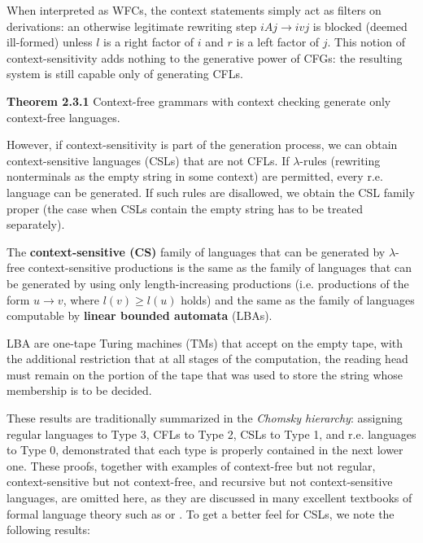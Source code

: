 {When interpreted as WFCs, the context statements simply act as filters on
derivations: an otherwise legitimate rewriting step $iAj \rightarrow ivj$ is
blocked (deemed ill-formed) unless $l$ is a right factor of $i$ and $r$ is a
left factor of $j$. This notion of context-sensitivity adds nothing to the
generative power of CFGs: the resulting system is still capable only of
generating CFLs. 

\smallskip\noindent
{\bf Theorem 2.3.1} \cite{McCawley:1968} Context-free grammars with context
checking generate only context-free languages.

\smallskip\noindent 
However, if context-sensitivity is part of the generation process, we can
obtain context-sensitive languages (CSLs) that are not CFLs. If $\lambda$-rules
(rewriting nonterminals as the empty string in some context) are permitted,
every r.e. language can be generated. If such rules are disallowed, we obtain
the CSL family proper (the case when CSLs contain the empty string has to be
treated separately). 

\smallskip{} \cite{Jones:1966} The {\bf
  context-sensitive (CS)} family of languages that can be generated by
$\lambda$-free context-sensitive productions
is the same as the family of languages that can be
generated by using only length-increasing productions (i.e. productions of the
form $u \rightarrow v$, where $l(v) \geq l(u)$ holds) and the same as the
family of languages computable by {\bf linear bounded automata} (LBAs).

\smallskip\noindent LBA are one-tape Turing machines (TMs) that accept on the
empty tape, with the additional restriction that at all stages of the
computation, the reading head must remain on the portion of the tape that was
used to store the string whose membership is to be decided.

These results are traditionally summarized in the {\it Chomsky hierarchy}:
assigning regular languages to Type 3, CFLs to Type 2, CSLs to Type 1, and
r.e. languages to Type 0,  demonstrated that each type
is properly contained in the next lower one. These
proofs, together with examples of context-free but not regular,
context-sensitive but not context-free, and recursive but not
context-sensitive languages, are omitted here, as they are discussed in many
excellent textbooks of formal language theory such as 
or . To get a better feel for CSLs, we note the
following results:

}
